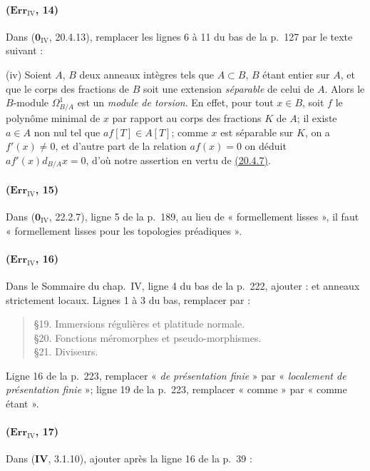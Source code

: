 \paragraph{($\mathbf{Err}_{\mathrm{IV}}$, 14)}
Dans ($\mathbf{0}_{\mathrm{IV}}$, 20.4.13), remplacer les lignes 6 à 11 du bas
de la p.~127 par le texte suivant :

\medskip
\noindent
(iv) Soient $A$, $B$ deux anneaux intègres tels que $A\subset B$, $B$
étant entier sur $A$, et que le corps des fractions de $B$ soit une
extension \emph{séparable} de celui de $A$. Alors le $B$-module
$\Omega^1_{B/A}$ est un \emph{module de torsion}. En effet, pour tout $x\in B$,
soit $f$ le polynôme minimal de $x$ par rapport au corps des fractions
$K$ de $A$; il existe $a\in A$ non nul tel que $af[T]\in A[T]$; comme
$x$ est séparable sur $K$, on a $f'(x)\neq0$, et d'autre part de la
relation $af(x)=0$ on déduit $af'(x)d_{B/A}x=0$, d'où notre assertion
en vertu de {\hyperlink{ega4.c04.cor.20-4-7}{(20.4.7)}}.

\paragraph{($\mathbf{Err}_{\mathrm{IV}}$, 15)}
Dans ($\mathbf{0}_{\mathrm{IV}}$, 22.2.7), ligne 5 de la p.~189, au lieu de
« formellement lisses », il faut « formellement lisses pour les
topologies préadiques ».

\paragraph{($\mathbf{Err}_{\mathrm{IV}}$, 16)}
Dans le Sommaire du chap.~IV, ligne 4 du bas de la p.~222, ajouter :
et anneaux strictement locaux. Lignes 1 à 3 du bas, remplacer par :
\begin{quote}
\S19. Immersions régulières et platitude normale.\\
\S20. Fonctions méromorphes et pseudo-morphismes.\\
\S21. Diviseurs.
\end{quote}
Ligne 16 de la p.~223, remplacer « \emph{de présentation finie} » par
« \emph{localement de présentation finie} »; ligne 19 de la p.~223, remplacer
« comme » par « comme étant ».

\paragraph{($\mathbf{Err}_{\mathrm{IV}}$, 17)}
Dans (\textbf{IV}, 3.1.10), ajouter après la ligne 16 de la p.~39 :

